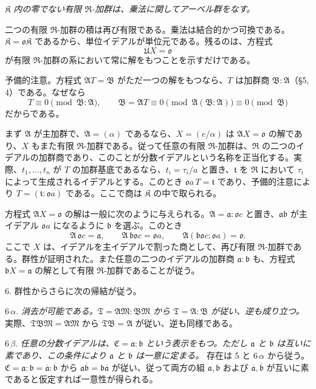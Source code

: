 \documentclass[11pt]{article}
\providecommand{\mR}{\mathfrak{R}}
\providecommand{\mK}{\mathfrak{K}}
\providecommand{\mbar}[1]{\overline{#1}}
\providecommand{\ma}{\mathfrak{a}}
\providecommand{\mb}{\mathfrak{b}}
\providecommand{\mo}{\mathfrak{o}}
\providecommand{\mt}{\mathfrak{t}}
\begin{document}
\emph{$\mK$ 内の零でない有限 $\mR$-加群は、乗法に関してアーベル群をなす。}

二つの有限 $\mR$-加群の積は再び有限である。乗法は結合的かつ可換である。$\mK=\mo\mK$ であるから、単位イデアルが単位元である。残るのは、方程式
\[
        \mathfrak U X=\mo
\]
が有限 $\mR$-加群の系において常に解をもつことを示すだけである。

予備的注意。方程式 $\mathfrak A T=\mathfrak B$ がただ一つの解をもつなら、$T$ は加群商 $\mathfrak B:\mathfrak A$（§5, 4）である。なぜなら
\[
        T\equiv0\pmod{\mathfrak B:\mathfrak A},
        \qquad
        \mathfrak B=\mathfrak A T\equiv0\pmod{\mathfrak A(\mathfrak B:\mathfrak A)}\equiv0\pmod{\mathfrak B}
\]
だからである。

まず $\mathfrak A$ が主加群で、$\mathfrak A=(\alpha)$ であるなら、$X=(e/\alpha)$ は $\mathfrak A X=\mo$ の解であり、$X$ もまた有限 $\mR$-加群である。従って任意の有限 $\mR$-加群は、$\mR$ の二つのイデアルの加群商であり、このことが分数イデアルという名称を正当化する。実際、$t_1,\ldots,t_n$ が $T$ の加群基底であるなら、$t_i=\tau_i/a$ と置き、$\mt$ を $\mR$ において $\tau_i$ によって生成されるイデアルとする。このとき $\mo a\,T=\mt$ であり、予備的注意により $T=(\mt:\mo a)$ である。ここで商は $\mK$ の中で取られる。

方程式 $\mathfrak A X=\mo$ の解は一般に次のように与えられる。$\mathfrak A=\ma:\mo c$ と置き、$\ma\mb$ が主イデアル $\mo a$ になるように $\mb$ を選ぶ。このとき
\[
        \mathfrak A\,\mo c=\ma,
        \qquad \mathfrak A\,\mb\mo c=\mo a,
        \qquad \mathfrak A(\mb\mo c:\mo a)=\mo.
\]
ここで $X$ は、イデアルを主イデアルで割った商として、再び有限 $\mR$-加群である。群性が証明された。また任意の二つのイデアルの加群商 $\ma:\mb$ も、方程式 $\mb X=\ma$ の解として有限 $\mR$-加群であることが従う。

6. 群性からさらに次の帰結が従う。

6\,$\alpha$. \emph{消去が可能である。$\mathfrak T=\mathfrak A\mathfrak M:\mathfrak B\mathfrak M$ から $\mathfrak T=\mathfrak A:\mathfrak B$ が従い、逆も成り立つ。} 実際、$\mathfrak T\mathfrak B\mathfrak M=\mathfrak A\mathfrak M$ から $\mathfrak T\mathfrak B=\mathfrak A$ が従い、逆も同様である。

6\,$\beta$. \emph{任意の分数イデアルは、$\mathfrak C=\ma:\mb$ という表示をもつ。ただし $\ma$ と $\mb$ は互いに素であり、この条件により $\ma$ と $\mb$ は一意に定まる。} 存在は 5 と 6\,$\alpha$ から従う。$\mathfrak C=\ma:\mb=\mbar\ma:\mbar\mb$ から $\ma\mbar\mb=\mb\mbar\ma$ が従い、従って両方の組 $\ma,\mb$ および $\mbar\ma,\mbar\mb$ が互いに素であると仮定すれば一意性が得られる。
\end{document}
